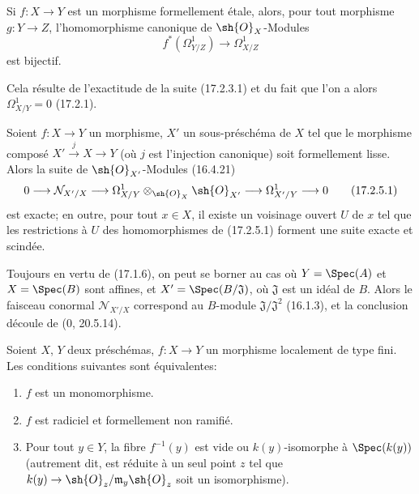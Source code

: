 \begin{corollary}[17.2.4]
\label{IV.17.2.4}
Si $f:X\to Y$ est un morphisme formellement étale, alors, pour tout morphisme $g:Y\to Z$, l'homomorphisme canonique de $\sh{O}_X$-Modules
\[
  f^*(\Omega_{Y/Z}^1)\longrightarrow\Omega_{X/Z}^1
\]
est bijectif.
\end{corollary}

Cela résulte de l'exactitude de la suite (17.2.3.1) et du fait que l'on a alors $\Omega_{X/Y}^1=0$ (17.2.1).

\begin{proposition}[17.2.5]
\label{IV.17.2.5}
Soient $f:X\to Y$ un morphisme, $X'$ un sous-préschéma de $X$ tel que le morphisme composé $X'\xrightarrow{j}X\to Y$ (où $j$ est l'injection canonique) soit formellement lisse. Alors la suite de $\sh{O}_{X'}$-Modules (16.4.21)
\[
\label{IV.17.2.5.1}
  0\longrightarrow\mathcal{N}_{X'/X}\longrightarrow\Omega_{X/Y}^1\otimes_{\sh{O}_X}\sh{O}_{X'}\longrightarrow\Omega_{X'/Y}^1\longrightarrow0
  \tag{17.2.5.1}
\]
est exacte; en outre, pour tout $x\in X$, il existe un voisinage ouvert $U$ de $x$ tel que les restrictions à $U$ des homomorphismes de (17.2.5.1) forment une suite exacte et scindée.
\end{proposition}

Toujours en vertu de (17.1.6), on peut se borner au cas où $Y=\Spec(A)$ et $X=\Spec(B)$ sont affines, et $X'=\Spec(B/\mathfrak{J})$, où $\mathfrak{J}$ est un idéal de $B$. Alors le faisceau conormal $\mathcal{N}_{X'/X}$ correspond au $B$-module $\mathfrak{J}/\mathfrak{J}^2$ (16.1.3), et la conclusion découle de (0, 20.5.14).

\begin{proposition}[17.2.6]
\label{IV.17.2.6}
Soient $X$, $Y$ deux préschémas, $f:X\to Y$ un morphisme localement de type fini. Les conditions suivantes sont équivalentes:
\begin{enumerate}
  \item[a)] $f$ est un monomorphisme.
  \item[b)] $f$ est radiciel et formellement non ramifié.
  \item[c)] Pour tout $y\in Y$, la fibre $f^{-1}(y)$ est vide ou $k(y)$-isomorphe à $\Spec(k(y))$ (autrement dit, est réduite à un seul point $z$ tel que $k(y)\to\sh{O}_z/\mathfrak{m}_y\sh{O}_z$ soit un isomorphisme).
\end{enumerate}
\end{proposition}

